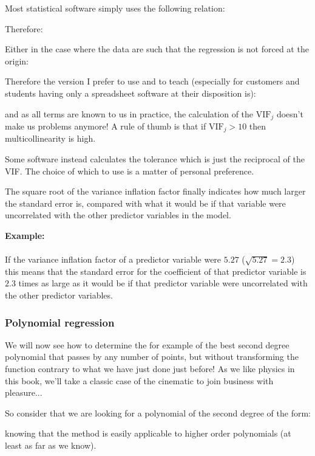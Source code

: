 	Most statistical software simply uses the following relation:
	
	Therefore:
	
	Either in the case where the data are such that the regression is not forced at the origin:
	
	Therefore the version I prefer to use and to teach (especially for customers and students having only a spreadsheet software at their disposition is):
	
 	and as all terms are known to us in practice, the calculation of the $\text{VIF}_j$ doesn't make us problems anymore!
	A rule of thumb is that if $\text{VIF}_j>10$ then multicollinearity is high.
	\begin{tcolorbox}[title=Remark,colframe=black,arc=10pt]
	Some software instead calculates the tolerance which is just the reciprocal of the VIF. The choice of which to use is a matter of personal preference.
	\end{tcolorbox}
	The square root of the variance inflation factor finally indicates how much larger the standard error is, compared with what it would be if that variable were uncorrelated with the other predictor variables in the model.
	\begin{tcolorbox}[colframe=black,colback=white,sharp corners]
	\textbf{{\Large {}}Example:}\\\\
	If the variance inflation factor of a predictor variable were $5.27$ ($\sqrt{5.27} = 2.3$) this means that the standard error for the coefficient of that predictor variable is $2.3$ times as large as it would be if that predictor variable were uncorrelated with the other predictor variables.
	\end{tcolorbox}
	
	\subsubsection{Polynomial regression}
	We will now see how to determine the for example of the best second degree polynomial that passes by any number of points, but without transforming the function contrary to what we have just done just before! As we like physics in this book, we'll take a classic case of the cinematic to join business with pleasure...
	
	So consider that we are looking for a polynomial of the second degree of the form:
	
	knowing that the method is easily applicable to higher order polynomials (at least as far as we know).
	
